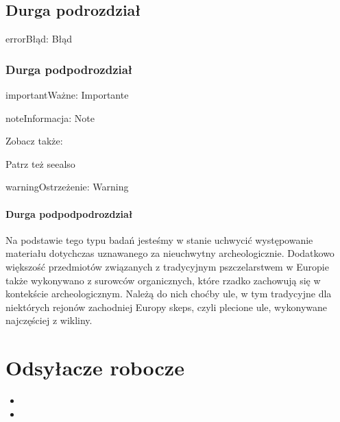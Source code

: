 \documentclass[letterpaper,10pt,polish]{sphinxmanual}
\let\sphinxpxdimen\pdfpxdimen\else\newdimen\sphinxpxdimen
\begin{document}
\section{Durga podrozdział}
\label{\detokenize{zrzut/index:durga-podrozdzial}}
\begin{sphinxadmonition}{error}{Błąd:}
\sphinxAtStartPar
Błąd
\end{sphinxadmonition}


\subsection{Durga podpodrozdział}
\label{\detokenize{zrzut/index:durga-podpodrozdzial}}
\begin{sphinxadmonition}{important}{Ważne:}
\sphinxAtStartPar
Importante
\sphinxincludegraphics[width=100\sphinxpxdimen]{{hha}.jpg}
\end{sphinxadmonition}

\begin{sphinxadmonition}{note}{Informacja:}
\sphinxAtStartPar
Note
\end{sphinxadmonition}


\begin{sphinxseealso}{Zobacz także:}

\sphinxAtStartPar
Patrz też seealso


\end{sphinxseealso}


\begin{sphinxadmonition}{warning}{Ostrzeżenie:}
\sphinxAtStartPar
Warning
\end{sphinxadmonition}


\subsubsection{Durga podpodpodrozdział}
\label{\detokenize{zrzut/index:durga-podpodpodrozdzial}}
\sphinxAtStartPar
{}

\sphinxAtStartPar
Na podstawie tego typu badań jesteśmy w stanie uchwycić występowanie materiału dotychczas uznawanego za nieuchwytny archeologicznie. Dodatkowo większość przedmiotów związanych z tradycyjnym pszczelarstwem w Europie także wykonywano z surowców organicznych, które rzadko zachowują się w kontekście archeologicznym. Należą do nich choćby ule, w tym tradycyjne dla niektórych rejonów zachodniej Europy skeps, czyli plecione ule, wykonywane najczęściej z wikliny.


\chapter{Odsyłacze robocze}
\label{\detokenize{index:odsylacze-robocze}}\begin{itemize}
\item {} 
\sphinxAtStartPar
{}

\item {} 
\sphinxAtStartPar
{}

\end{itemize}



\renewcommand{\indexname}{Indeks}
\printindex
\end{document}
